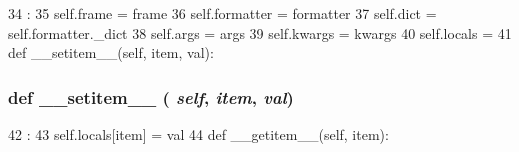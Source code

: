 \begin{DoxyCode}
34                                                          :
35         self.frame = frame
36         self.formatter = formatter
37         self.dict = self.formatter._dict
38         self.args = args
39         self.kwargs = kwargs
40         self.locals = {}
41 
    def __setitem__(self, item, val):
\end{DoxyCode}
\hypertarget{classm5_1_1util_1_1code__formatter_1_1lookup_a09195b01147e970ca71c48b57f653940}{
\subsubsection[{\_\-\_\-setitem\_\-\_\-}]{\setlength{\rightskip}{0pt plus 5cm}def \_\-\_\-setitem\_\-\_\- ( {\em self}, \/   {\em item}, \/   {\em val})}}
\label{classm5_1_1util_1_1code__formatter_1_1lookup_a09195b01147e970ca71c48b57f653940}



\begin{DoxyCode}
42                                     :
43         self.locals[item] = val
44 
    def __getitem__(self, item):
\end{DoxyCode}


